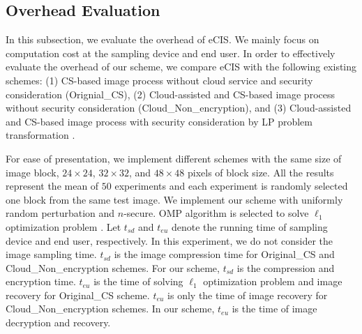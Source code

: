 \documentclass[conference]{IEEEtran}
\begin{document}
\subsection{Overhead Evaluation}
In this subsection, we evaluate the overhead of eCIS. We mainly focus on computation cost at the sampling device and end user.  In order to effectively evaluate the overhead of our scheme, we compare eCIS with the following existing schemes:
(1) CS-based image process without cloud service and  security consideration (Orignial\_CS),
(2) Cloud-assisted and CS-based image process without security consideration (Cloud\_Non\_encryption),
and (3) Cloud-assisted and CS-based image process with security consideration by LP problem transformation  \cite{wang2014privacy}.

For ease of presentation, we implement different schemes with the same size of image block, $24\times24$, $32\times32$, and $48\times48$ pixels of block size. All the results represent the mean of $50$ experiments and each experiment is randomly selected one block from the same test image. We implement our scheme with uniformly random perturbation and $n$-secure. OMP algorithm is selected to solve $\ell_1$ optimization problem \cite{OMP}. Let $t_{sd}$ and $t_{eu}$ denote the running time of sampling device and  end user, respectively. In this experiment, we do not consider the image sampling time. $t_{sd}$ is the image compression time for Original\_CS and Cloud\_Non\_encryption schemes. For our scheme, $t_{sd}$ is the compression and encryption time. $t_{eu}$ is the time of solving $\ell_1$ optimization problem and image recovery for Original\_CS scheme. $t_{eu}$ is only the time of image recovery for Cloud\_Non\_encryption schemes.  In our scheme, $t_{eu}$ is the time of image decryption and recovery.
\end{document}
